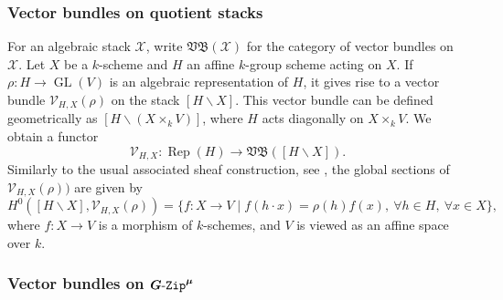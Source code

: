 \documentclass[10pt,a4paper]{article}
\numberwithin{equation}{section}
\theoremstyle{definition}
\theoremstyle{remark}
\newcommand{\GZip}{\mathop{\text{$G$-{\tt Zip}}}\nolimits}
\newcommand{\VB}{\mathfrak{VB}}
\newcommand{\Vcal}{{\mathcal V}}
\newcommand{\Xcal}{{\mathcal X}}
\DeclareMathOperator{\Rep}{Rep}
\DeclareMathOperator{\GL}{GL}
\newcommand{\lra}{\longrightarrow}
\begin{document}
\subsubsection{Vector bundles on quotient stacks} \label{sec-genth-vb}
For an algebraic stack $\Xcal$, write $\VB(\Xcal)$ for the category of vector bundles on $\Xcal$. Let $X$ be a $k$-scheme and $H$ an affine $k$-group scheme acting on $X$. If $\rho \colon H\to \GL(V)$ is an algebraic representation of $H$, it gives rise to a vector bundle $\Vcal_{H,X}(\rho)$ on the stack $[H\backslash X]$. This vector bundle can be defined geometrically as $[H\backslash (X\times_k V)]$, where $H$ acts diagonally on $X\times_k V$. We obtain a functor
\begin{equation}\label{funct-rep}
    \Vcal_{H,X} \colon \Rep(H)\lra \VB([H\backslash X]).
\end{equation}
Similarly to the usual associated sheaf construction, see \cite[Section~5.8, Equation (1)]{jantzen-representations}, the global sections of $\Vcal_{H,X}(\rho))$ are given by
\begin{equation}\label{globquot}
 H^0([H\backslash X],\Vcal_{H,X}(\rho))
 =\{f \colon X\to V \mid  f(h \cdot x)=\rho(h) f(x) , \  \forall h\in H, \ \forall x\in X\},
\end{equation}
where $f\colon X\to V$ is a morphism of $k$-schemes, and $V$ is viewed as an affine space over $k$.

\subsubsection{Vector bundles on \texorpdfstring{$\boldsymbol{\GZip^\mu}$}{GZip\textasciicircum\{mu\}}} \label{sec-VB-Gzip}
\end{document}
